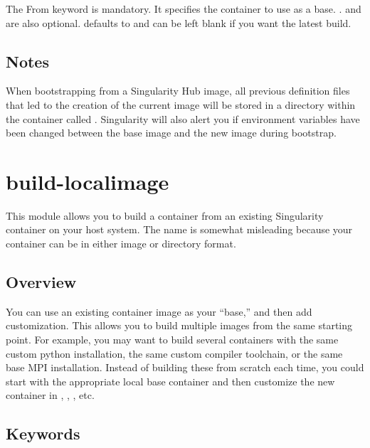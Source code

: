 \documentclass[letterpaper,10pt,english]{sphinxmanual}
\begin{document}
The From keyword is mandatory. It specifies the container to use as a base. .
 and  are also optional.  defaults to  and  can be left blank if you want the latest build.


\subsection{Notes}
\label{\detokenize{appendix:id4}}
When bootstrapping from a Singularity Hub image, all previous definition files that led to the creation of the current image will be stored
in a directory within the container called . Singularity will also alert you if environment variables have
been changed between the base image and the new image during bootstrap.


\section{build-localimage}
\label{\detokenize{appendix:build-localimage}}\label{\detokenize{appendix:sec-build-localimage}}
This module allows you to build a container from an existing Singularity container on your host system. The name is somewhat misleading
because your container can be in either image or directory format.


\subsection{Overview}
\label{\detokenize{appendix:id5}}
You can use an existing container image as your “base,” and then add customization. This allows you to build multiple images from the same
starting point. For example, you may want to build several containers with the same custom python installation, the same custom compiler
toolchain, or the same base MPI installation. Instead of building these from scratch each time, you could start with the appropriate local
base container and then customize the new container in , , , etc.


\subsection{Keywords}
\label{\detokenize{appendix:id6}}
%
\begin{sphinxVerbatim}[commandchars=\\\{\}]
 
\end{sphinxVerbatim}
\end{document}

